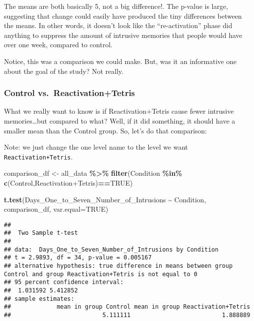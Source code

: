 \documentclass[
]{book}
\newenvironment{Shaded}{\begin{snugshade}}{\end{snugshade}}
\newcommand{\AttributeTok}[1]{\textcolor[rgb]{0.13,0.29,0.53}{#1}}
\newcommand{\ConstantTok}[1]{\textcolor[rgb]{0.56,0.35,0.01}{#1}}
\newcommand{\FunctionTok}[1]{\textcolor[rgb]{0.13,0.29,0.53}{\textbf{#1}}}
\newcommand{\NormalTok}[1]{#1}
\newcommand{\OtherTok}[1]{\textcolor[rgb]{0.56,0.35,0.01}{#1}}
\newcommand{\SpecialCharTok}[1]{\textcolor[rgb]{0.81,0.36,0.00}{\textbf{#1}}}
\newcommand{\StringTok}[1]{\textcolor[rgb]{0.31,0.60,0.02}{#1}}
\begin{document}
The means are both basically 5, not a big difference!. The p-value is large, suggesting that change could easily have produced the tiny differences between the means. In other words, it doesn't look like the ``re-activation'' phase did anything to suppress the amount of intrusive memories that people would have over one week, compared to control.

Notice, this was a comparison we could make. But, was it an informative one about the goal of the study? Not really.

\hypertarget{control-vs.-reactivationtetris}{%
\subsubsection{Control vs.~Reactivation+Tetris}\label{control-vs.-reactivationtetris}}

What we really want to know is if Reactivation+Tetris cause fewer intrusive memories\ldots but compared to what? Well, if it did something, it should have a smaller mean than the Control group. So, let's do that comparison:

Note: we just change the one level name to the level we want \texttt{Reactivation+Tetris}.

\begin{Shaded}
\begin{Highlighting}[]
\NormalTok{comparison\_df }\OtherTok{\textless{}{-}}\NormalTok{ all\_data }\SpecialCharTok{\%\textgreater{}\%} 
                  \FunctionTok{filter}\NormalTok{(Condition }\SpecialCharTok{\%in\%} \FunctionTok{c}\NormalTok{(}\StringTok{\textquotesingle{}Control\textquotesingle{}}\NormalTok{,}\StringTok{\textquotesingle{}Reactivation+Tetris\textquotesingle{}}\NormalTok{)}\SpecialCharTok{==}\ConstantTok{TRUE}\NormalTok{)}
                        
\FunctionTok{t.test}\NormalTok{(Days\_One\_to\_Seven\_Number\_of\_Intrusions }\SpecialCharTok{\textasciitilde{}}\NormalTok{ Condition, }
\NormalTok{       comparison\_df,}
       \AttributeTok{var.equal=}\ConstantTok{TRUE}\NormalTok{)}
\end{Highlighting}
\end{Shaded}

\begin{verbatim}
## 
##  Two Sample t-test
## 
## data:  Days_One_to_Seven_Number_of_Intrusions by Condition
## t = 2.9893, df = 34, p-value = 0.005167
## alternative hypothesis: true difference in means between group Control and group Reactivation+Tetris is not equal to 0
## 95 percent confidence interval:
##  1.031592 5.412852
## sample estimates:
##             mean in group Control mean in group Reactivation+Tetris 
##                          5.111111                          1.888889
\end{verbatim}
\end{document}
